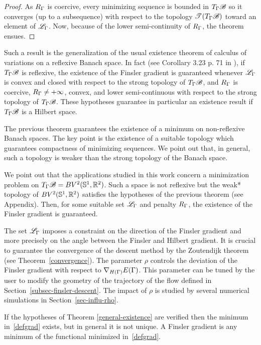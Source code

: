\begin{proof} As $R_\Gamma$ is coercive, every minimizing sequence is bounded in $T_\Gamma\mathcal{B}$ so  it converges (up to a subsequence) with respect to the topology $\mathcal{T}(T_\Gamma\mathcal{B})$ toward an element of $\mathcal{L}_\Gamma$. Now, because of the lower semi-continuity of $R_\Gamma$, the theorem ensues.
\end{proof}

\par Such a result is the generalization of the usual existence theorem of calculus of variations on a reflexive Banach space. In fact (see Corollary 3.23 p. 71 in \cite{Brezis}), if  $T_\Gamma\mathcal{B}$ is reflexive, the existence of the Finsler gradient is guaranteed whenever  $\mathcal{L}_\Gamma$ is convex and closed with respect to the strong topology of $T_\Gamma\mathcal{B}$, and $R_\Gamma$ is  coercive, $R_\Gamma\neq+\infty$, convex, and lower semi-continuous  with respect to the strong topology of $T_\Gamma\mathcal{B}$. These hypotheses guarantee in particular an existence result if $T_\Gamma\mathcal{B}$ is a Hilbert space.
\par The previous theorem guarantees the existence of a minimum on non-reflexive Banach spaces. The key point is the existence of a suitable topology which guarantees compactness of minimizing sequences. We point out that, in general, such a topology is weaker than the strong topology of the Banach space. 
\par We point out that the applications studied in this work concern a minimization problem on $T_\Gamma\mathcal{B}=BV^2(\mathbb{S}^1,\mathbb{R}^2)$. Such a space is not reflexive but the weak* topology of $BV^2(\mathbb{S}^1,\mathbb{R}^2)$ satisfies the hypotheses of the previous theorem (see Appendix). Then, for some suitable set $\mathcal{L}_\Gamma$ and penalty $R_\Gamma$, the existence of the Finsler gradient is guaranteed.
\par The set $\mathcal{L}_\Gamma$ imposes a constraint on the direction of the Finsler gradient and more precisely on the angle between the Finsler and Hilbert gradient. It is crucial to guarantee the convergence of the descent method by the Zoutendijk theorem (see Theorem~\ref{convergence}). The parameter $\rho$ controls the deviation of the Finsler gradient with respect to $\nabla_{H(\Gamma)}E (\Gamma)$. This parameter can be tuned by the user to modify the geometry of the trajectory of the flow defined in Section~\ref{subsec-finsler-descent}. The impact of $\rho$ is studied by several numerical simulations in Section~\ref{sec-influ-rho}.

If  the hypotheses of Theorem \ref{general-existence} are verified then  the minimum in~\eqref{defgrad} exists, but in general it is not unique. A Finsler gradient is any minimum of the functional minimized in~\eqref{defgrad}.

